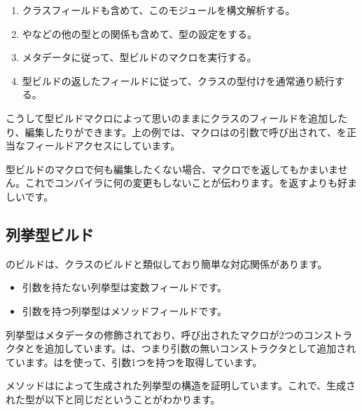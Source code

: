 \begin{enumerate}
	\item クラスフィールドも含めて、このモジュールを構文解析する。
	\item {}やなどの他の型との関係も含めて、型の設定をする。
	\item {}メタデータに従って、型ビルドのマクロを実行する。
	\item 型ビルドの返したフィールドに従って、クラスの型付けを通常通り続行する。
\end{enumerate}

こうして型ビルドマクロによって思いのままにクラスのフィールドを追加したり、編集したりができます。上の例では、マクロはの引数で呼び出されて、を正当なフィールドアクセスにしています。

型ビルドのマクロで何も編集したくない場合、マクロでを返してもかまいません。これでコンパイラに何の変更もしないことが伝わります。を返すよりも好ましいです。



\subsection{列挙型ビルド}
\label{macro-enum-building}

のビルドは、クラスのビルドと類似しており簡単な対応関係があります。

\begin{itemize}
	\item 引数を持たない列挙型は変数フィールドです。
	\item 引数を持つ列挙型はメソッドフィールドです。
\end{itemize}



列挙型はメタデータの修飾されており、呼び出されたマクロが2つのコンストラクタとを追加しています。は、つまり引数の無いコンストラクタとして追加されています。はを使って、引数1つを持つを取得しています。

メソッドはによって生成された列挙型の構造を証明しています。これで、生成された型が以下と同じだということがわかります。

